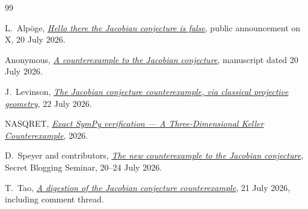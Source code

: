\documentclass[11pt,reqno]{amsart}
\theoremstyle{definition}
\theoremstyle{remark}
\begin{document}
\begingroup
\footnotesize
\setlength{\parskip}{0pt}
\begin{thebibliography}{99}

L.~Alpöge,
\emph{\href{https://x.com/__alpoge__/status/2079028340955197566}
{Hello there the Jacobian conjecture is false}},
public announcement on X, 20 July 2026.

Anonymous,
\emph{\href{https://www.ulam.ai/research/jacobian.pdf}
{A counterexample to the Jacobian conjecture}},
manuscript dated 20 July 2026.

J.~Levinson,
\emph{\href{https://levjake.wordpress.com/2026/07/22/the-jacobian-conjecture-counterexample/}
{The Jacobian conjecture counterexample, via classical projective geometry}},
22 July 2026.

NASQRET,
\emph{\href{https://nasqret.github.io/jacobian-counterexample/book/notebooks/sympy-verification.html}
{Exact SymPy verification --- A Three-Dimensional Keller Counterexample}},
2026.

D.~Speyer and contributors,
\emph{\href{https://sbseminar.wordpress.com/2026/07/20/the-new-counterexample-to-the-jacobian-conjecture/}
{The new counterexample to the Jacobian conjecture}},
Secret Blogging Seminar, 20--24 July 2026.

T.~Tao,
\emph{\href{https://terrytao.wordpress.com/2026/07/21/a-digestion-of-the-jacobian-conjecture-counterexample/}
{A digestion of the Jacobian conjecture counterexample}},
21 July 2026, including comment thread.

\end{thebibliography}
\endgroup
\end{document}

